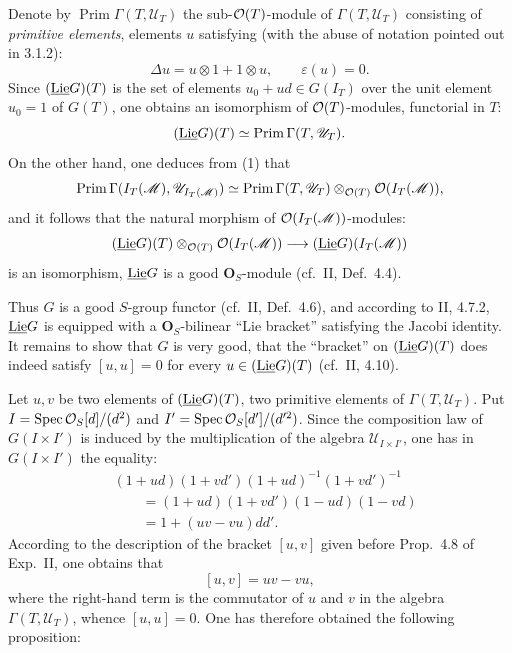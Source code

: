 Denote by $\operatorname{Prim}\Gamma(T,\mathscr U_T)$ the sub-$\mathcal{O}(T)$-module of $\Gamma(T,\mathscr U_T)$ consisting of \emph{primitive elements}, \ie elements $u$ satisfying (with the abuse of notation pointed out in 3.1.2):
\[
\Delta u=u\otimes1+1\otimes u,\qquad\varepsilon(u)=0.
\]
Since $(\underline{\operatorname{Lie}} G)(T)$ is the set of elements $u_0+ud\in G(I_T)$ over the unit element $u_0=1$ of $G(T)$, one obtains an isomorphism of $\mathcal{O}(T)$-modules, functorial in $T$:
\[
(\underline{\operatorname{Lie}} G)(T)\simeq\operatorname{Prim}\Gamma(T,\mathscr U_T).
\]
On the other hand, one deduces from (1) that
\[
\operatorname{Prim}\Gamma(I_T(\mathscr M),\mathscr U_{I_T(\mathscr M)})\simeq\operatorname{Prim}\Gamma(T,\mathscr U_T)\otimes_{\mathcal{O}(T)}\mathcal{O}(I_T(\mathscr M)),
\]
and it follows that the natural morphism of $\mathcal{O}(I_T(\mathscr M))$-modules:
\[
(\underline{\operatorname{Lie}} G)(T)\otimes_{\mathcal{O}(T)}\mathcal{O}(I_T(\mathscr M))\longrightarrow(\underline{\operatorname{Lie}} G)(I_T(\mathscr M))
\]
is an isomorphism, \ie $\underline{\operatorname{Lie}} G$ is a good $\mathbf O_S$-module (cf.\ II, Def.\ 4.4).

Thus $G$ is a good $S$-group functor (cf.\ II, Def.\ 4.6), and according to II, 4.7.2, $\underline{\operatorname{Lie}} G$ is equipped with a $\mathbf O_S$-bilinear ``Lie bracket'' satisfying the Jacobi identity. It remains to show that $G$ is very good, \ie that the ``bracket'' on $(\underline{\operatorname{Lie}} G)(T)$ does indeed satisfy $[u,u]=0$ for every $u\in(\underline{\operatorname{Lie}} G)(T)$ (cf.\ II, 4.10).

Let $u,v$ be two elements of $(\underline{\operatorname{Lie}} G)(T)$, \ie two primitive elements of $\Gamma(T,\mathscr U_T)$. Put $I=\operatorname{Spec}\mathcal{O}_S[d]/(d^2)$ and $I'=\operatorname{Spec}\mathcal{O}_S[d']/(d'^2)$. Since the composition law of $G(I\times I')$ is induced by the multiplication of the algebra $\mathscr U_{I\times I'}$, one has in $G(I\times I')$ the equality:
\[
\begin{aligned}
&(1+ud)(1+vd')(1+ud)^{-1}(1+vd')^{-1}\\
&\qquad=(1+ud)(1+vd')(1-ud)(1-vd)\\
&\qquad=1+(uv-vu)dd'.
\end{aligned}
\]
According to the description of the bracket $[u,v]$ given before Prop.\ 4.8 of Exp.\ II, one obtains that
\[
[u,v]=uv-vu,
\]
where the right-hand term is the commutator of $u$ and $v$ in the algebra $\Gamma(T,\mathscr U_T)$, whence $[u,u]=0$. One has therefore obtained the following proposition:

